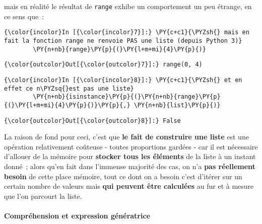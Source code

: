     mais en réalité le résultat de \texttt{range} exhibe un comportement un
peu étrange, en ce sens que~:

    \begin{Verbatim}[commandchars=\\\{\},frame=single,framerule=0.3mm,rulecolor=\color{cellframecolor}]
{\color{incolor}In [{\color{incolor}7}]:} \PY{c+c1}{\PYZsh{} mais en fait la fonction range ne renvoie PAS une liste (depuis Python 3)}
        \PY{n+nb}{range}\PY{p}{(}\PY{l+m+mi}{4}\PY{p}{)}
\end{Verbatim}


\begin{Verbatim}[commandchars=\\\{\},frame=single,framerule=0.3mm,rulecolor=\color{cellframecolor}]
{\color{outcolor}Out[{\color{outcolor}7}]:} range(0, 4)
\end{Verbatim}
            
    \begin{Verbatim}[commandchars=\\\{\},frame=single,framerule=0.3mm,rulecolor=\color{cellframecolor}]
{\color{incolor}In [{\color{incolor}8}]:} \PY{c+c1}{\PYZsh{} et en effet ce n\PYZsq{}est pas une liste}
        \PY{n+nb}{isinstance}\PY{p}{(}\PY{n+nb}{range}\PY{p}{(}\PY{l+m+mi}{4}\PY{p}{)}\PY{p}{,} \PY{n+nb}{list}\PY{p}{)}
\end{Verbatim}


\begin{Verbatim}[commandchars=\\\{\},frame=single,framerule=0.3mm,rulecolor=\color{cellframecolor}]
{\color{outcolor}Out[{\color{outcolor}8}]:} False
\end{Verbatim}
            
    La raison de fond pour ceci, c'est que \textbf{le fait de construire une
liste} est une opération relativement coûteuse - toutes proportions
gardées - car il est nécessaire d'allouer de la mémoire pour
\textbf{stocker tous les éléments} de la liste à un instant donné~;
alors qu'en fait dans l'immense majorité des cas, on n'a \textbf{pas
réellement besoin} de cette place mémoire, tout ce dont on a besoin
c'est d'itérer sur un certain nombre de valeurs mais \textbf{qui peuvent
être calculées} au fur et à mesure que l'on parcourt la liste.

    \hypertarget{compruxe9hension-et-expression-guxe9nuxe9ratrice}{%
\paragraph{Compréhension et expression
génératrice}\label{compruxe9hension-et-expression-guxe9nuxe9ratrice}}


